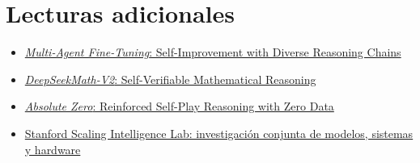 \section{Lecturas adicionales}

\begin{itemize}
    \item \href{https://arxiv.org/search/?query=Multi-Agent+Fine-Tuning\&searchtype=all}{\emph{Multi-Agent Fine-Tuning}: Self-Improvement with Diverse Reasoning Chains}
    \item \href{https://arxiv.org/search/?query=DeepSeekMath-V2\&searchtype=all}{\emph{DeepSeekMath-V2}: Self-Verifiable Mathematical Reasoning}
    \item \href{https://arxiv.org/search/?query=Absolute+Zero+Reinforced+Self-play+Reasoning+with+Zero+Data\&searchtype=all}{\emph{Absolute Zero}: Reinforced Self-Play Reasoning with Zero Data}
    \item \href{https://scalingintelligence.stanford.edu/}{Stanford Scaling Intelligence Lab: investigación conjunta de modelos, sistemas y hardware}
\end{itemize}

